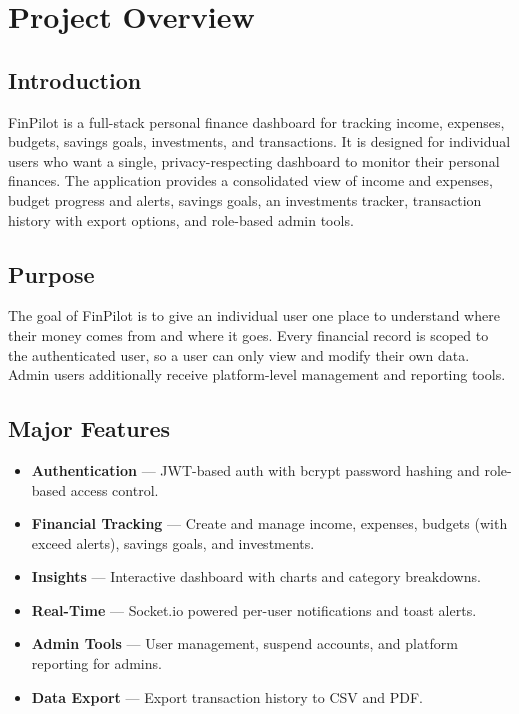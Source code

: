 \documentclass[11pt,a4paper]{report}
\begin{document}
\chapter{Project Overview}

\section{Introduction}
FinPilot is a full-stack personal finance dashboard for tracking income,
expenses, budgets, savings goals, investments, and transactions. It is designed
for individual users who want a single, privacy-respecting dashboard to monitor
their personal finances. The application provides a consolidated view of income
and expenses, budget progress and alerts, savings goals, an investments tracker,
transaction history with export options, and role-based admin tools.

\section{Purpose}
The goal of FinPilot is to give an individual user one place to understand where
their money comes from and where it goes. Every financial record is scoped to the
authenticated user, so a user can only view and modify their own data. Admin
users additionally receive platform-level management and reporting tools.

\section{Major Features}
\begin{itemize}[leftmargin=1.4em]
  \item \textbf{Authentication} --- JWT-based auth with bcrypt password hashing
        and role-based access control.
  \item \textbf{Financial Tracking} --- Create and manage income, expenses,
        budgets (with exceed alerts), savings goals, and investments.
  \item \textbf{Insights} --- Interactive dashboard with charts and category
        breakdowns.
  \item \textbf{Real-Time} --- Socket.io powered per-user notifications and
        toast alerts.
  \item \textbf{Admin Tools} --- User management, suspend accounts, and platform
        reporting for admins.
  \item \textbf{Data Export} --- Export transaction history to CSV and PDF.
\end{itemize}
\end{document}

